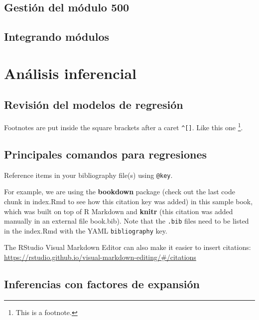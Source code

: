 \documentclass[
]{book}
\theoremstyle{definition}
\theoremstyle{definition}
\theoremstyle{definition}
\theoremstyle{definition}
\theoremstyle{remark}
\begin{document}
\hypertarget{gestiuxf3n-del-muxf3dulo-500}{%
\section{Gestión del módulo 500}\label{gestiuxf3n-del-muxf3dulo-500}}

\hypertarget{integrando-muxf3dulos}{%
\section{Integrando módulos}\label{integrando-muxf3dulos}}

\hypertarget{anuxe1lisis-inferencial}{%
\chapter{Análisis inferencial}\label{anuxe1lisis-inferencial}}

\hypertarget{revisiuxf3n-del-modelos-de-regresiuxf3n}{%
\section{Revisión del modelos de regresión}\label{revisiuxf3n-del-modelos-de-regresiuxf3n}}

Footnotes are put inside the square brackets after a caret \texttt{\^{}{[}{]}}. Like this one \footnote{This is a footnote.}.

\hypertarget{principales-comandos-para-regresiones}{%
\section{Principales comandos para regresiones}\label{principales-comandos-para-regresiones}}

Reference items in your bibliography file(s) using \texttt{@key}.

For example, we are using the \textbf{bookdown} package \citep{R-bookdown} (check out the last code chunk in index.Rmd to see how this citation key was added) in this sample book, which was built on top of R Markdown and \textbf{knitr} \citep{xie2015} (this citation was added manually in an external file book.bib).
Note that the \texttt{.bib} files need to be listed in the index.Rmd with the YAML \texttt{bibliography} key.

The RStudio Visual Markdown Editor can also make it easier to insert citations: \url{https://rstudio.github.io/visual-markdown-editing/\#/citations}

\hypertarget{inferencias-con-factores-de-expansiuxf3n}{%
\section{Inferencias con factores de expansión}\label{inferencias-con-factores-de-expansiuxf3n}}
\end{document}
